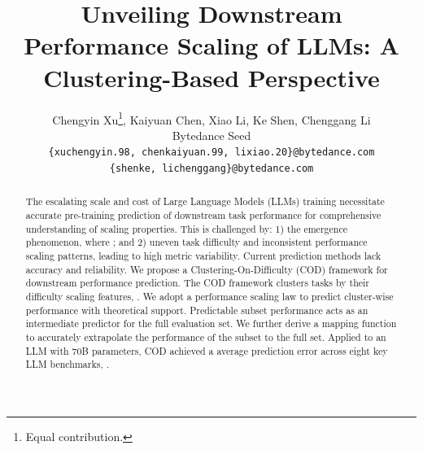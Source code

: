 \documentclass{article} %
\title{Unveiling Downstream Performance Scaling of LLMs: A Clustering-Based Perspective}
\author{Chengyin Xu\thanks{Equal contribution.}, Kaiyuan Chen\footnotemark[1], Xiao Li, Ke Shen, Chenggang Li \\
Bytedance Seed\\
\texttt{\{xuchengyin.98, chenkaiyuan.99, lixiao.20\}@bytedance.com} \\
\texttt{\{shenke, lichenggang\}@bytedance.com}
}
\newcommand{\revise}[1]{{\color{black}{#1}}}
\newcommand{\camera}[1]{{\color{black}{#1}}}
\begin{document}
\maketitle

\begin{abstract}
The escalating scale and cost of Large Language Models (LLMs) training necessitate accurate pre-training prediction of downstream task performance for comprehensive understanding of scaling properties. This is challenged by: 1) the emergence phenomenon, where \revise{unpredictable capabilities appearing suddenly at critical model scales}; and 2) uneven task difficulty and inconsistent performance scaling patterns, leading to high metric variability. Current prediction methods lack accuracy and reliability. We propose a Clustering-On-Difficulty (COD) framework for downstream performance prediction. The COD framework clusters tasks by their difficulty scaling features, \camera{thereby constructing a more stable and predictable task subset that exhibits well-behaved scaling characteristics with the increase of compute budget}. We adopt a performance scaling law to predict cluster-wise performance with theoretical support. Predictable subset performance acts as an intermediate predictor for the full evaluation set. We further derive a mapping function to accurately extrapolate the performance of the subset to the full set. Applied to an LLM with 70B parameters, COD achieved a \camera{1.55\%} average prediction error across eight key LLM benchmarks, \camera{thus providing actionable insights for scaling properties and training monitoring during LLM pre-training}.
\end{abstract}
    




















\newpage


\appendix

{\small\tableofcontents}  %

\setcounter{table}{0} 
\setcounter{figure}{0}
\setcounter{proposition}{0}
\setcounter{theorem}{0}

\renewcommand{\thefigure}{A\arabic{figure}}
\renewcommand{\thetable}{A\arabic{table}}
\renewcommand{\thetheorem}{A\arabic{theorem}}





\end{document}
